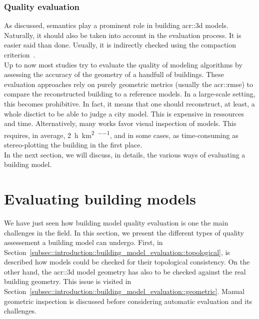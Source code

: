        \subsubsection{Quality evaluation}
            As discussed, semantics play a prominent role in building \gls{acr::3d} models.
            Naturally, it should also be taken into account in the evaluation process.
            It is easier said than done.
            Usually, it is indirectly checked using the compaction criterion~\parencite{lafarge2012creating}.\\
            Up to now most studies try to evaluate the quality of modeling algorithms by assessing the accuracy of the geometry of a handfull of buildings.
            These evaluation approaches rely on purely geometric metrics (usually the \gls{acr::rmse}) to compare the reconstructed building to a reference models.
            In a large-scale setting, this becomes prohibitive.
            In fact, it means that one should reconstruct, at least, a whole disctict to be able to judge a city model.
            This is expensive in ressources and time.
            Alternatively, many works favor visual inspection of models.
            This requires, in average, \SI[per-mode=repeated-symbol]{2}{\hour\per\km\squared\per\expert}, and in some cases, as time-consuming  as stereo-plotting the building in the first place.\\
            In the next section, we will discuss, in details, the various ways of evaluating a building model.

\section{Evaluating building models}
    \label{sec::introduction::building_model_evaluation}
    We have just seen how building model quality evaluation is one the main challenges in the field.
    In this section, we present the different types of quality assessement a building model can undergo.
    First, in Section~\ref{subsec::introduction::building_model_evaluation::topological}, is described how models could be checked for their topological consistency.
    On the other hand, the \gls{acr::3d} model geometry has also to be checked against the real building geometry.
    This issue is visited in Section~\ref{subsec::introduction::building_model_evaluation::geometric}.
    Manual geometric inspection is discussed before considering automatic evaluation and its challenges.

